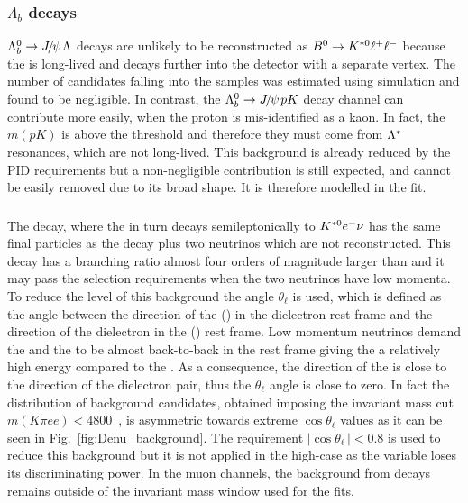 \subsubsection{$\Lambda_b$ decays}

$\Lb\to\jpsi\Lz$ decays are unlikely to be reconstructed as ${{B}^0} \rightarrow {\ensuremath{{K}^{*0}}} \ell^+ \ell^-$ because
the \Lz is long-lived and decays further into the detector with a separate vertex.
The number of candidates falling into the \Bz samples was estimated using simulation and found to be negligible. 
In contrast, the $\Lb\to\jpsi pK$ decay channel can contribute more easily, when the proton is mis-identified as a kaon.
In fact, the $m(pK)$ is above the \Lz threshold and therefore they must come from ${\Lambda}^*$ resonances, 
 which are not long-lived. This background is already reduced by the PID requirements but a non-negligible contribution 
 is still expected, and cannot be easily removed due to its broad shape. It is therefore modelled in the fit.

\subsubsection{ }

The \decay{\Bd}{\Dm\ep\nu} decay, where the \Dm in turn decays semileptonically to ${{K}^{*0}}{e^-}\nu$ has the same final particles
as the \BdToKstee decay plus two neutrinos which are not reconstructed. This decay has a branching ratio almost four orders of 
magnitude larger than \BdToKstee and it may pass the selection requirements when the two neutrinos have low momenta. 
To reduce the level of this background the angle $\theta_\ell$ is used, which is defined as the angle between the direction of the \ep (\en)
in the dielectron rest frame and the direction of the dielectron in the \Bd (\Bdb) rest frame. 
Low momentum neutrinos demand the \Dm and the \ep to be almost back-to-back in the \Bd rest frame giving the \ep a relatively
high energy compared to the \en. As a consequence, the direction of the \ep is close to the direction of the dielectron pair, thus the
$\theta_\ell$ angle is close to zero. In fact the distribution of background candidates, obtained imposing the invariant mass cut
$m(K\pi ee) < 4800$~\mevcc, is asymmetric towards extreme $\cos \theta_\ell$ values as it can be seen in 
Fig.~\ref{fig:Denu_background}. The requirement $|\cos \theta_\ell\,|< 0.8$ is used to reduce this background but 
it is not applied in the high-\qsq case as the variable loses its discriminating power.
In the muon channels, the background from  decays remains outside 
of the invariant mass window used for the fits.

